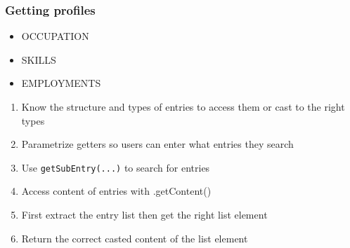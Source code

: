 \documentclass[12pt]{article}
\begin{document}
\begin{verbatim}

\end{verbatim}

\subsubsection{Getting profiles}

\begin{itemize}
  \item OCCUPATION
  \item SKILLS
  \item EMPLOYMENTS
\end{itemize}

\begin{enumerate}
\item Know the structure and types of entries to access them or cast to the right types
\item Parametrize getters so users can enter what entries they search
\item Use {\tt getSubEntry(...)} to search for entries
\item Access content of entries with .getContent()
\item First extract the entry list then get the right list element
\item Return the correct casted content of the list element
\end{enumerate}
\end{document}
